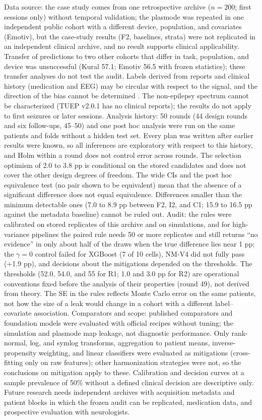 Data source: the case study comes from one retrospective archive ($n = 200$; first sessions only) without temporal validation; the plasmode was repeated in one independent public cohort with a different device, population, and covariates (Emotiv), but the case-study results (F2, baselines, strata) were not replicated in an independent clinical archive, and no result supports clinical applicability. Transfer of predictions to two other cohorts that differ in task, population, and device was unsuccessful (Kural 57.1; Emotiv 56.5 with frozen statistics); these transfer analyses do not test the audit. Labels derived from reports and clinical history (medication and EEG) may be circular with respect to the signal, and the direction of the bias cannot be determined \cite{veloso2017}. The non-epilepsy spectrum cannot be characterized (TUEP v2.0.1 has no clinical reports); the results do not apply to first seizures or later sessions.
Analysis history: 50 rounds (44 design rounds and six follow-ups, 45--50) and one post hoc analysis were run on the same patients and folds without a hidden test set. Every plan was written after earlier results were known, so all inferences are exploratory with respect to this history, and Holm within a round does not control error across rounds. The selection optimism of 2.0 to 3.8 pp is conditional on the stored candidates and does not cover the other design degrees of freedom. The wide CIs and the post hoc equivalence test (no pair shown to be equivalent) mean that the absence of a significant difference does not equal equivalence. Differences smaller than the minimum detectable ones (7.0 to 8.9 pp between F2, I2, and C1; 15.9 to 16.5 pp against the metadata baseline) cannot be ruled out.
Audit: the rules were calibrated on stored replicates of this archive and on simulations, and for high-variance pipelines the paired rule needs 50 or more replicates and still returns ``no evidence'' in only about half of the draws when the true difference lies near 1 pp; the $\gamma=0$ control failed for XGBoost (7 of 10 cells), NM-V4 did not fully pass (+1.9 pp), and decisions about the mitigations depended on the thresholds. The thresholds (52.0, 54.0, and 55 for R1; 1.0 and 3.0 pp for R2) are operational conventions fixed before the analysis of their properties (round 49), not derived from theory. The SE in the rules reflects Monte Carlo error on the same patients, not how the size of a leak would change in a cohort with a different label--covariate association.
Comparators and scope: published comparators and foundation models were evaluated with official recipes without tuning; the simulation and plasmode map leakage, not diagnostic performance. Only rank-normal, log, and symlog transforms, aggregation to patient means, inverse-propensity weighting, and linear classifiers were evaluated as mitigations (cross-fitting only on raw features); other harmonization strategies were not, so the conclusions on mitigation apply to these. Calibration and decision curves at a sample prevalence of 50\% without a defined clinical decision are descriptive only. Future research needs independent archives with acquisition metadata and patient blocks in which the frozen audit can be replicated, medication data, and prospective evaluation with neurologists.
